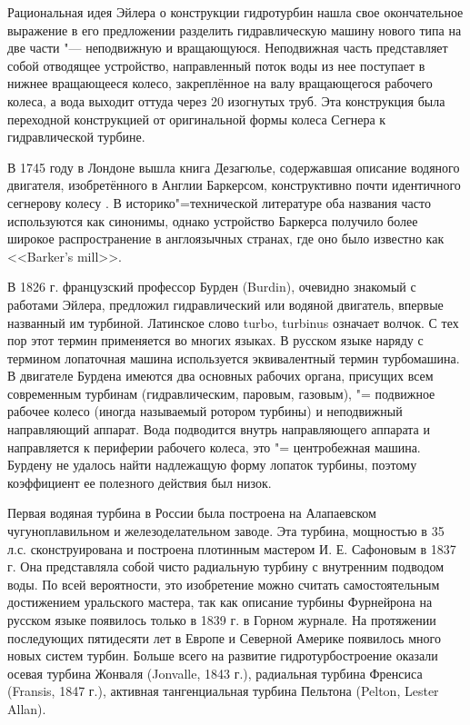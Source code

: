 Рациональная идея Эйлера о конструкции гидротурбин нашла свое окончательное выражение в его предложении разделить гидравлическую машину нового типа на две части "--- неподвижную и вращающуюся. Неподвижная часть представляет собой отводящее устройство, направленный поток воды из нее поступает в нижнее вращающееся колесо, закреплённое на валу вращающегося рабочего колеса, а вода выходит оттуда через 20 изогнутых труб. Эта конструкция была переходной конструкцией от оригинальной формы колеса Сегнера к гидравлической турбине. \cite{krivchenko,bozarov2023}

В 1745 году в Лондоне вышла книга Дезагюлье, содержавшая описание водяного
двигателя, изобретённого в Англии Баркерсом, конструктивно почти идентичного сегнерову
колесу \cite{konchakov}. В историко"=технической литературе оба названия часто используются как
синонимы, однако устройство Баркерса получило более широкое распространение в
англоязычных странах, где оно было известно как <<Barker's mill>>.

В 1826 г. французский профессор Бурден (Burdin), очевидно знакомый с работами Эйлера, предложил гидравлический или водяной двигатель, впервые названный им турбиной. Латинское слово turbo, turbinus означает волчок. С тех пор этот термин применяется во многих языках. В русском языке наряду с термином лопаточная машина используется эквивалентный термин турбомашина. В двигателе Бурдена имеются два основных рабочих органа, присущих всем современным турбинам (гидравлическим, паровым, газовым), "= подвижное рабочее колесо (иногда называемый ротором турбины) и неподвижный направляющий аппарат. Вода подводится внутрь направляющего аппарата и направляется к периферии рабочего колеса, это "= центробежная машина. Бурдену не удалось найти надлежащую форму лопаток турбины, поэтому коэффициент ее полезного действия был низок.

Первая водяная турбина в России была построена на Алапаевском чугуноплавильном и железоделательном заводе. Эта турбина, мощностью в 35 л.с. сконструирована и построена плотинным мастером И. Е. Сафоновым в 1837 г. Она представляла собой чисто радиальную турбину с внутренним подводом воды. По всей вероятности, это изобретение можно считать самостоятельным достижением уральского мастера, так как описание турбины Фурнейрона на русском языке появилось только в 1839 г. в Горном журнале. На протяжении последующих пятидесяти лет в Европе и Северной Америке появилось много новых систем турбин. Больше всего на развитие гидротурбостроение оказали осевая турбина Жонваля (Jonvalle, 1843 г.), радиальная турбина Френсиса (Fransis, 1847 г.), активная тангенциальная турбина Пельтона (Pelton, Lester Allan).

